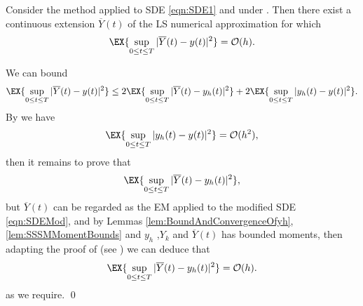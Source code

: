 \begin{thm}
	Consider the \SM method applied to SDE \eqref{eqn:SDE1} and under .
	Then there exist a continuous extension $\overline{Y}(t)$ of the LS numerical approximation for which
	\begin{equation*}
		\EX{
			\sup_{0 \leq t \leq T}
			|\overline{Y}(t) - y(t)|^2	
		} = \mathcal{O}(h).	
	\end{equation*}
\end{thm}
\begin{pf}
	 We can bound
	\begin{align*}
		\EX{
			\sup_{0 \leq t \leq T}	
			|\overline{Y}(t) - y(t)|^2
		}
		&\leq 
		2 \EX{
			\sup_{0 \leq t \leq T}	
			|\overline{Y}(t) - y_h(t)|^2
		}
		+
		2 \EX{
			\sup_{0 \leq t \leq T}	
			|y_h(t) - y(t) |^2
		}.\\		
	\end{align*}	
	By  we have
	$$
		\EX{
			\sup_{0 \leq t \leq T}	
			|y_h(t) - y(t) |^2 
		}= \mathcal{O}(h^2),
	$$
	then it remains to prove that 
	$$
		\EX{
			\sup_{0 \leq t \leq T}	
			|\overline{Y}(t) - y_h(t)|^2
		},
	$$
	but  $\overline{Y}(t)$ can be regarded as the EM applied to the modified SDE \eqref{eqn:SDEMod}, and by
	Lemmas \eqref{lem:BoundAndConvergenceOfyh},\eqref{lem:SSSMMomentBounds} and 
	$y_h$ ,$Y_k$ and $\overline{Y}(t)$ has bounded moments, then adapting the proof of 
	 (see \cite[Thm. 4.4]{Higham2002b}) we can deduce that
	\begin{equation*}
		\EX{
			\sup_{0 \leq t \leq T}	
			|\overline{Y}(t) - y_h(t)|^2
		} = \mathcal{O}(h).
	\end{equation*}
	as we require. \qed
\end{pf}
%
